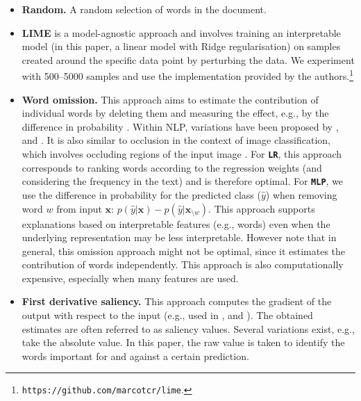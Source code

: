 \documentclass[11pt,a4paper]{article}
\begin{document}
\begin{itemize}
\item \textbf{Random.} A random selection of words in the document.
\item \textbf{LIME} \cite{Ribeiro:2016:WIT:2939672.2939778} is a model-agnostic approach and involves training an interpretable model (in this paper, a linear model with Ridge regularisation)  on samples created around the specific data point by perturbing the data. We experiment with 500--5000 samples and use the implementation provided by the authors.\footnote{\texttt{https://github.com/marcotcr/lime}.} 
\item \textbf{Word omission.} This approach aims to estimate the contribution of individual words by deleting them and measuring the effect, e.g., by the difference in probability \cite{4407709}. Within NLP, variations have been proposed by  \citet{DBLP:journals/corr/KadarCA16},  \citet{li2016understanding} and \citet{Martens:2014:EDD:2600518.2600523}. 
It is also similar to occlusion in the context of image classification, which involves occluding    regions of the input image \cite{Zeiler2014}. For \textbf{\texttt{LR}}, this approach corresponds to ranking words  according to the regression weights (and considering the frequency in the text) and is therefore optimal. For \textbf{\texttt{MLP}}, we use the difference in probability for the predicted class ($\hat{y}$) when removing word $w$ from input $\bm{x}$: $p(\hat{y}|\bm{x}) - p(\hat{y}|\bm{x}_{\setminus w})$. This approach supports explanations based on interpretable features (e.g., words)  even when the underlying representation may be less interpretable. However note that in general,   this omission approach might not be  optimal, since it estimates the contribution of words independently.
This approach is also computationally  expensive, especially when many features are used. 
\item \textbf{First derivative saliency.} This approach computes the gradient of the output with respect to the input (e.g., used in \citet{aubakirova-bansal:2016:EMNLP2016}, \citet{li-EtAl:2016:N16-12} and \citet{DBLP:journals/corr/SimonyanVZ13}). The obtained estimates are often referred to as saliency values. Several variations exist, e.g., \citet{li-EtAl:2016:N16-12} take the absolute value. In this paper, the raw value is taken to identify the words important for and against a certain prediction. 

\end{itemize}
\end{document}
